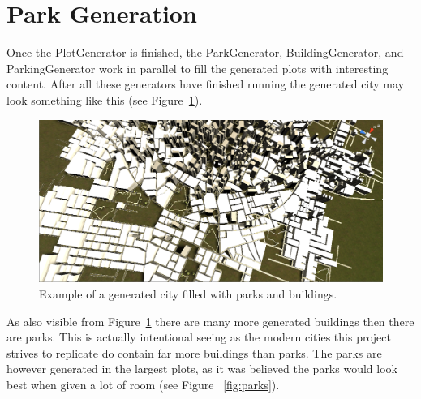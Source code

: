 \section{Park Generation}

Once the PlotGenerator is finished, the ParkGenerator, BuildingGenerator, and ParkingGenerator work in parallel to fill the generated plots with interesting content.
After all these generators have finished running the generated city may look something like this (see Figure~\ref{fig:ex}).
\begin{figure}
\includegraphics[width=\linewidth]{figure/notforcingloops.png}
 \caption{Example of a generated city filled with parks and buildings.}
 \label{fig:ex}
 \end{figure}
As also visible from Figure~\ref{fig:ex} there are many more generated buildings then there are parks. 
This is actually intentional seeing as the modern cities this project strives to replicate do contain far more buildings than parks. 
The parks are however generated in the largest plots, as it was believed the parks would look best when given a lot of room (see Figure ~\ref{fig:parks}). 


